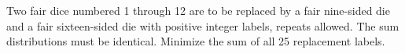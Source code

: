 Two fair dice numbered 1 through 12 are to be replaced by a fair nine-sided die and a fair sixteen-sided die with positive integer labels, repeats allowed. The sum distributions must be identical. Minimize the sum of all 25 replacement labels.
